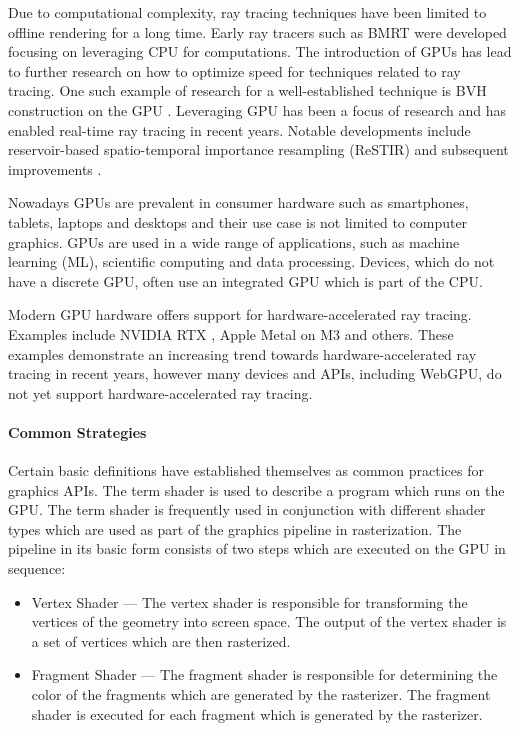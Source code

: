 Due to computational complexity, ray tracing techniques have been limited to offline rendering for a long time. Early ray tracers such as \gls{BMRT} were developed focusing on leveraging \gls{CPU} for computations. The introduction of \glspl{GPU} has lead to further research on how to optimize speed for techniques related to ray tracing. One such example of research for a well-established technique is \gls{BVH} construction on the \gls{GPU} \cite{lauterbach2009GPUbvh}. Leveraging \gls{GPU} has been a focus of research and has enabled real-time ray tracing in recent years. Notable developments include reservoir-based spatio-temporal importance resampling (ReSTIR) \cite{restir} and subsequent improvements \cite{restirAdvancements,restirGeneralized}.

Nowadays \glspl{GPU} are prevalent in consumer hardware such as smartphones, tablets, laptops and desktops and their use case is not limited to computer graphics. \glspl{GPU} are used in a wide range of applications, such as machine learning (\gls{ML}), scientific computing and data processing. Devices, which do not have a discrete \gls{GPU}, often use an integrated \gls{GPU} which is part of the \gls{CPU}.

Modern \gls{GPU} hardware offers support for hardware-accelerated ray tracing. Examples include NVIDIA RTX \cite{nvidiaRtxRayTracing}, Apple Metal on M3 \cite{appleM3GpuAdvancements} and others. These examples demonstrate an increasing trend towards hardware-accelerated ray tracing in recent years, however many devices and \glspl{API}, including \gls{WebGPU}, do not yet support hardware-accelerated ray tracing.

\paragraph{Common Strategies}
\label{sec:commonGpuStrategies}

Certain basic definitions have established themselves as common practices for graphics \glspl{API}. The term shader is used to describe a program which runs on the \gls{GPU}. The term shader is frequently used in conjunction with different shader types which are used as part of the graphics pipeline in rasterization. The pipeline in its basic form consists of two steps which are executed on the \gls{GPU} in sequence:

\begin{itemize}
    \item{Vertex Shader} — The vertex shader is responsible for transforming the vertices of the geometry into screen space. The output of the vertex shader is a set of vertices which are then rasterized.
    \item{Fragment Shader} — The fragment shader is responsible for determining the color of the fragments which are generated by the rasterizer. The fragment shader is executed for each fragment which is generated by the rasterizer.
\end{itemize}

